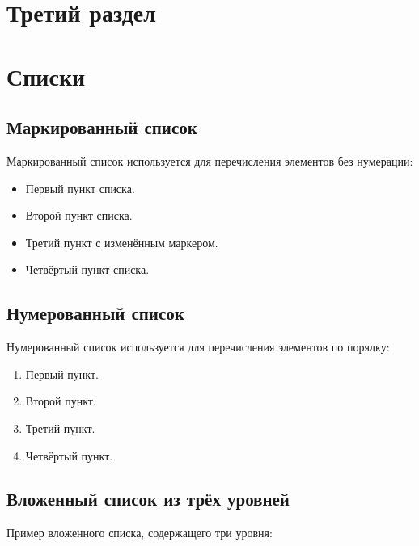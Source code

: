 \documentclass[a4paper,14 pt]{article}
\begin{document}
\section{Третий раздел}

\section{Списки}

\subsection{Маркированный список}

Маркированный список используется для перечисления элементов без нумерации:

\begin{itemize}
  \item Первый пункт списка.
  \item Второй пункт списка.
  \item[-] Третий пункт с изменённым маркером.
  \item Четвёртый пункт списка.
\end{itemize}

\subsection{Нумерованный список}

Нумерованный список используется для перечисления элементов по порядку:

\begin{enumerate}
  \item Первый пункт.
  \item Второй пункт.
  \item Третий пункт.
  \item Четвёртый пункт.
\end{enumerate}

\subsection{Вложенный список из трёх уровней}

Пример вложенного списка, содержащего три уровня:
\end{document}
